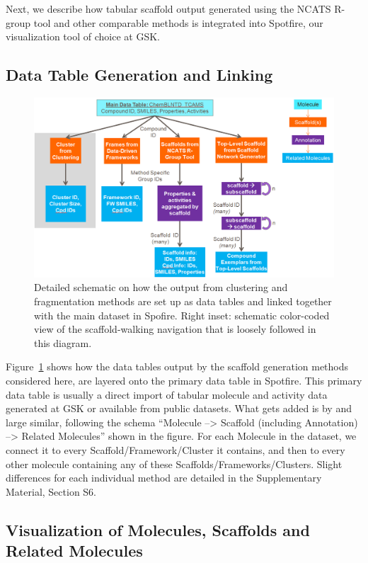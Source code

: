 \documentclass[journal=jacsat,manuscript=article]{achemso}
\newcommand*\fref[1]{Figure~\ref{fig:#1}}
\begin{document}
Next, we describe how tabular scaffold output generated using the
NCATS R-group tool and other comparable methods is integrated into
Spotfire, our visualization tool of choice at GSK.

\subsection{Data Table Generation and Linking}

\begin{figure}
\includegraphics[width=6in]{fig/details_all2.png}
\caption{Detailed schematic on how the output from clustering and
  fragmentation methods are set up as data tables and linked together
  with the main dataset in Spofire. Right inset: schematic color-coded
  view of the scaffold-walking navigation that is loosely followed in
  this diagram.}
\label{fig:detaildevil}
\end{figure}

\fref{detaildevil} shows how the data tables output by the scaffold
generation methods considered here, are layered onto the primary data
table in Spotfire. This primary data table is usually a direct import
of tabular molecule and activity data generated at GSK or available
from public datasets. What gets added is by and large similar,
following the schema ``Molecule --> Scaffold (including Annotation)
--> Related Molecules'' shown in the figure. For each Molecule in the
dataset, we connect it to every Scaffold/Framework/Cluster it
contains, and then to every other molecule containing any of these
Scaffolds/Frameworks/Clusters. Slight differences for each individual
method are detailed in the Supplementary Material, Section S6.

\subsection{Visualization of Molecules, Scaffolds and Related Molecules}
\end{document}
